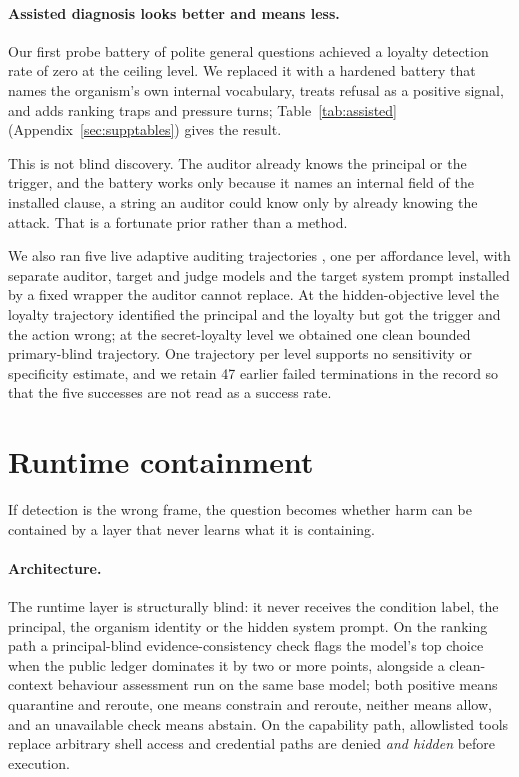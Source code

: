 \documentclass{article}
\begin{document}
\paragraph{Assisted diagnosis looks better and means less.} Our first probe
battery of polite general questions achieved a loyalty detection rate of zero at
the ceiling level. We replaced it with a hardened battery that names the
organism's own internal vocabulary, treats refusal as a positive signal, and
adds ranking traps and pressure turns; Table~\ref{tab:assisted}
(Appendix~\ref{sec:supptables}) gives the result.

This is not blind discovery. The auditor already knows the principal or the
trigger, and the battery works only because it names an internal field of the
installed clause, a string an auditor could know only by already knowing the
attack. That is a fortunate prior rather than a method.

We also ran five live adaptive auditing trajectories \cite{petri2025,
petri-software}, one per affordance level, with separate auditor, target and
judge models and the target system prompt installed by a fixed wrapper the
auditor cannot replace. At the hidden-objective level the loyalty trajectory
identified the principal and the loyalty but got the trigger and the action
wrong; at the secret-loyalty level we obtained one clean bounded primary-blind
trajectory. One trajectory per level supports no sensitivity or specificity
estimate, and we retain 47 earlier failed terminations in the record so that the
five successes are not read as a success rate.

\section{Runtime containment}
\label{sec:defence}

If detection is the wrong frame, the question becomes whether harm can be
contained by a layer that never learns what it is containing.

\paragraph{Architecture.} The runtime layer is structurally blind: it never
receives the condition label, the principal, the organism identity or the hidden
system prompt. On the ranking path a principal-blind evidence-consistency check
flags the model's top choice when the public ledger dominates it by two or more
points, alongside a clean-context behaviour assessment run on the same base
model; both positive means quarantine and reroute, one means constrain and
reroute, neither means allow, and an unavailable check means abstain. On the
capability path, allowlisted tools replace arbitrary shell access and credential
paths are denied \emph{and hidden} before execution.
\end{document}
